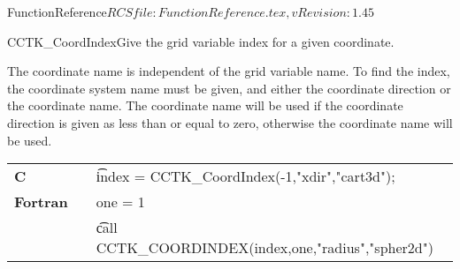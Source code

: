 \begin{cactuspart}{5}{FunctionReference}{$RCSfile: FunctionReference.tex,v $}{$Revision: 1.45 $}
\begin{CCTKFunc}{CCTK\_CoordIndex}{Give the grid variable index for a given coordinate.}
\label{CCTK-CoordIndex}
\showargs
\begin{params}
\end{params}
\begin{discussion}
The coordinate name is independent of the grid variable name.
To find the index, the coordinate system name must be given, and either
the coordinate direction or the coordinate name. The coordinate name
will be used if the coordinate direction is given as less than or equal to zero, otherwise the coordinate name will be used.
\end{discussion}
\begin{examples}
\begin{tabular}{@{}p{3cm}cp{11cm}}
\hfill {\bf C} && {\t index = CCTK\_CoordIndex(-1,"xdir","cart3d")};
\\
\hfill {\bf Fortran} && one = 1
\\
&& {\t call  CCTK\_COORDINDEX(index,one,"radius","spher2d")}
\\
\end{tabular}
\end{examples}
\begin{errorcodes}
\end{errorcodes}
\end{CCTKFunc}




\end{cactuspart}
